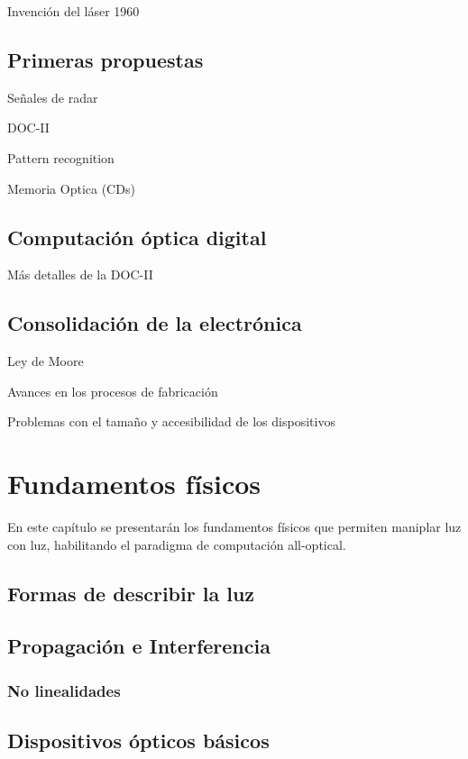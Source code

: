 \documentclass[12pt,a4paper]{report}
\begin{document}
Invención del láser 1960

\section{Primeras propuestas}

Señales de radar

DOC-II

Pattern recognition

Memoria Optica (CDs)

\section{Computación óptica digital}

Más detalles de la DOC-II

\section{Consolidación de la electrónica}

Ley de Moore

Avances en los procesos de fabricación

Problemas con el tamaño y accesibilidad de los dispositivos


\chapter{Fundamentos físicos}

En este capítulo se presentarán los fundamentos físicos que permiten maniplar luz con luz, habilitando el paradigma de computación all-optical.

\section{Formas de describir la luz}

\section{Propagación e Interferencia}

\subsection{No linealidades}

\section{Dispositivos ópticos básicos}
\end{document}
